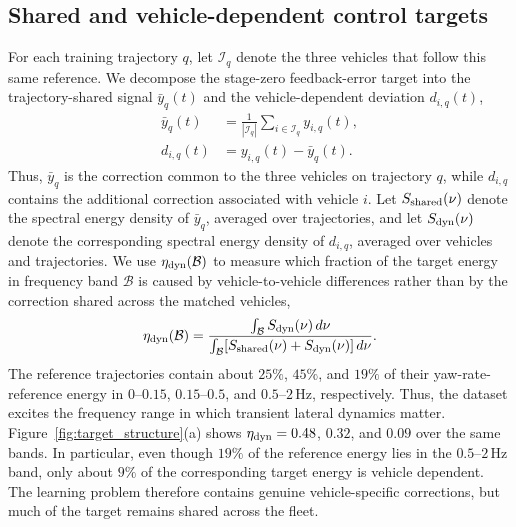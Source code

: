 \subsection{Shared and vehicle-dependent control targets}
%
For each training trajectory $q$, let $\mathcal I_q$ denote the three vehicles that follow this same reference.
We decompose the stage-zero feedback-error target into the trajectory-shared signal
$\bar y_q(t)$ and the vehicle-dependent deviation $d_{i,q}(t)$,
%
\begin{align}
    \bar y_q(t)&=\frac{1}{|\mathcal I_q|}\sum_{i\in\mathcal I_q}y_{i,q}(t), \nonumber \\
    d_{i,q}(t)&=y_{i,q}(t)-\bar y_q(t).
\label{eq:target_decomposition}
\end{align}
%
Thus, $\bar y_q$ is the correction common to the three vehicles on trajectory $q$, while $d_{i,q}$ contains the additional correction associated with vehicle $i$.
Let $S_{\rm shared}(\nu)$ denote the spectral energy density of $\bar y_q$, averaged over trajectories, and let $S_{\rm dyn}(\nu)$ denote the corresponding spectral energy density of $d_{i,q}$, averaged over vehicles and trajectories.
We use $\eta_{\rm dyn}(\mathcal B)$ to measure which fraction of the target energy in frequency band $\mathcal B$ is caused by vehicle-to-vehicle differences rather than by the correction shared across the matched vehicles,
%
\begin{equation}
\eta_{\rm dyn}(\mathcal B)=
\frac{\int_{\mathcal B}S_{\rm dyn}(\nu)\,d\nu}
{\int_{\mathcal B}[S_{\rm shared}(\nu)+S_{\rm dyn}(\nu)]\,d\nu}.
\label{eq:relative_target_heterogeneity}
\end{equation}
%
The reference trajectories contain about $25\%$, $45\%$, and $19\%$ of their yaw-rate-reference energy in $0$--$0.15$, $0.15$--$0.5$, and $0.5$--$2\,\mathrm{Hz}$, respectively.
Thus, the dataset excites the frequency range in which transient lateral dynamics matter.
Figure~\ref{fig:target_structure}(a) shows $\eta_{\rm dyn}=0.48$, $0.32$, and $0.09$ over the same bands.
In particular, even though $19\%$ of the reference energy lies in the $0.5$--$2\,\mathrm{Hz}$ band, only about $9\%$ of the corresponding target energy is vehicle dependent.
The learning problem therefore contains genuine vehicle-specific corrections, but much of the target remains shared across the fleet.

